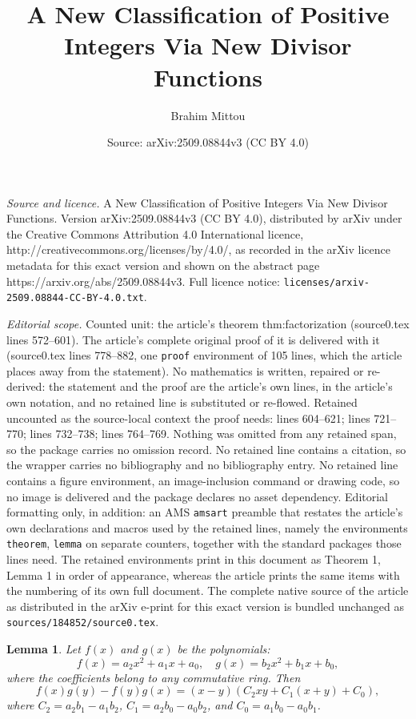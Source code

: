 \documentclass[10pt,a4paper]{amsart}
\title{A New Classification of Positive Integers Via New Divisor Functions}
\author{Brahim Mittou}
\date{Source: arXiv:2509.08844v3 (CC BY 4.0)}
\newtheorem{lemma}{Lemma}
\begin{document}
\maketitle

\noindent\emph{Source and licence.} A New Classification of Positive Integers Via New Divisor Functions. Version arXiv:2509.08844v3 (CC BY 4.0), distributed by arXiv under the Creative Commons Attribution 4.0 International licence, http://creativecommons.org/licenses/by/4.0/, as recorded in the arXiv licence metadata for this exact version and shown on the abstract page https://arxiv.org/abs/2509.08844v3. Full licence notice: \texttt{licenses/arxiv-2509.08844-CC-BY-4.0.txt}.\par\smallskip

\noindent\textit{Editorial scope.} Counted unit: the article's theorem thm:factorization (source0.tex lines 572--601). The article's complete original proof of it is delivered with it (source0.tex lines 778--882, one \texttt{proof} environment of 105 lines, which the article places away from the statement). No mathematics is written, repaired or re-derived: the statement and the proof are the article's own lines, in the article's own notation, and no retained line is substituted or re-flowed.  Retained uncounted as the source-local context the proof needs: lines 604--621; lines 721--770; lines 732--738; lines 764--769.  Nothing was omitted from any retained span, so the package carries no omission record.  No retained line contains a citation, so the wrapper carries no bibliography and no bibliography entry.  No retained line contains a figure environment, an image-inclusion command or drawing code, so no image is delivered and the package declares no asset dependency.  Editorial formatting only, in addition: an AMS \texttt{amsart} preamble that restates the article's own declarations and macros used by the retained lines, namely the environments \texttt{theorem}, \texttt{lemma} on separate counters, together with the standard packages those lines need.  The retained environments print in this document as Theorem 1, Lemma 1 in order of appearance, whereas the article prints the same items with the numbering of its own full document.  The complete native source of the article as distributed in the arXiv e-print for this exact version is bundled unchanged as \texttt{sources/184852/source0.tex}.
\begin{lemma}\label{lem:determinant}
Let $f(x)$ and $g(x)$ be the polynomials:
\[
f(x)=a_2x^2+a_1x+a_0,\quad
g(x)=b_2x^2+b_1x+b_0,
\]
where the coefficients belong to any commutative ring. Then
\[
f(x)g(y)-f(y)g(x)
=
(x-y)
\left(
C_2xy+C_1(x+y)+C_0
\right),
\]
where
$C_2=a_2b_1-a_1b_2$, $C_1=a_2b_0-a_0b_2$, and $C_0=a_1b_0-a_0b_1$.
\end{lemma}
\end{document}
